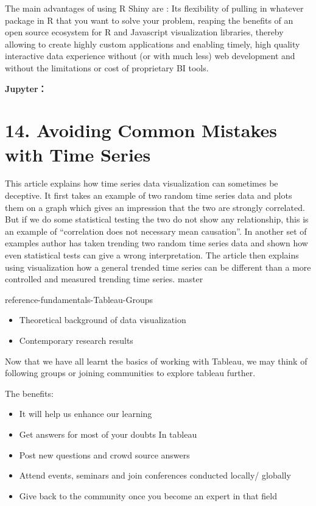 \documentclass[]{book}
\providecommand{\tightlist}{%
  \setlength{\itemsep}{0pt}\setlength{\parskip}{0pt}}
\theoremstyle{definition}
\theoremstyle{definition}
\theoremstyle{definition}
\theoremstyle{remark}
\begin{document}
The main advantages of using R Shiny are : Its flexibility of pulling in
whatever package in R that you want to solve your problem, reaping the
benefits of an open source ecosystem for R and Javascript visualization
libraries, thereby allowing to create highly custom applications and
enabling timely, high quality interactive data experience without (or
with much less) web development and without the limitations or cost of
proprietary BI tools.

\citep{shiny_interactive_viz}

\textbf{Jupyter：}

\section{14. Avoiding Common Mistakes with Time
Series}\label{avoiding-common-mistakes-with-time-series}

This article explains how time series data visualization can sometimes
be deceptive. It first takes an example of two random time series data
and plots them on a graph which gives an impression that the two are
strongly correlated. But if we do some statistical testing the two do
not show any relationship, this is an example of ``correlation does not
necessary mean causation''. In another set of examples author has taken
trending two random time series data and shown how even statistical
tests can give a wrong interpretation. The article then explains using
visualization how a general trended time series can be different than a
more controlled and measured trending time series. master

reference-fundamentals-Tableau-Groups

\begin{itemize}
\tightlist
\item
  Theoretical background of data visualization\\
\item
  Contemporary research results
\end{itemize}

Now that we have all learnt the basics of working with Tableau, we may
think of following groups or joining communities to explore tableau
further.

The benefits:

\begin{itemize}
\tightlist
\item
  It will help us enhance our learning
\item
  Get answers for most of your doubts In tableau
\item
  Post new questions and crowd source answers
\item
  Attend events, seminars and join conferences conducted locally/
  globally
\item
  Give back to the community once you become an expert in that field
\end{itemize}
\end{document}
